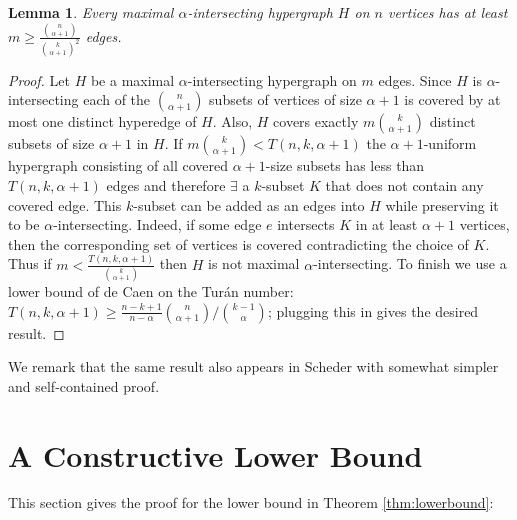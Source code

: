\documentclass[11pt,letterpaper]{article}
\newtheorem{theorem}{Theorem}
\newtheorem{lemma}[theorem]{Lemma}
\begin{document}
\begin{lemma}\label{lem:maximal-hypergraphs}
Every maximal $\alpha$-intersecting hypergraph $H$ on $n$ vertices has at least $m \geq \frac{\binom{n}{\alpha+1}}{\binom{k}{\alpha+1}^2}$ edges. 
\end{lemma}
\begin{proof}
Let $H$ be a maximal $\alpha$-intersecting hypergraph on $m$ edges. Since $H$ is $\alpha$-intersecting each of the $\binom{n}{\alpha+1}$ subsets of vertices of size $\alpha+1$ is covered by at most one distinct hyperedge of $H$. Also, $H$ covers exactly $m \binom{k}{\alpha+1}$ distinct subsets of size $\alpha+1$ in $H$. If $m{\binom{k}{\alpha+1}} < {T(n,k,\alpha+1)}$ the $\alpha+1$-uniform hypergraph consisting of all covered $\alpha+1$-size subsets has less than $T(n,k,\alpha+1)$ edges and therefore $\exists$ a $k$-subset $K$ that does not contain any covered edge. This $k$-subset can be added as an edges into $H$ while preserving it to be $\alpha$-intersecting. Indeed, if some edge $e$ intersects $K$ in at least $\alpha+1$ vertices, then the corresponding set of vertices is covered contradicting the choice of $K$. Thus if $m<\frac{T(n,k,\alpha+1)}{\binom{k}{\alpha+1}}$ then $H$ is not maximal $\alpha$-intersecting. To finish we use a lower bound of de Caen \cite{de1983extension} on the Tur{\'a}n number: $T(n,k,\alpha+1) \geq \frac{n-k+1}{n-\alpha}\binom{n}{\alpha+1}/\binom{k-1}{\alpha}$; plugging this in gives the desired result.
\end{proof}

We remark that the same result also appears in Scheder 
\cite{scheder08almostdisjoint} with somewhat simpler and
self-contained proof.


\section{A Constructive Lower Bound}

This section gives the proof for the lower bound in Theorem \ref{thm:lowerbound}:\\
\iffalse
\begin{theorem}\label{thm:lowerbound}
Every $\alpha$-intersecting $k$-CNF with less than 
\[\i = \frac{1}{2\alpha} \left(\frac{2^{(k-\alpha)}}{ek}-1\right)^{(2+1/\alpha)} \] clause intersections or
$$n =  \left(\frac{2^{(k-\alpha)}}{ek}\right)^{1/\alpha} $$ variables or 
$$m = \frac{1}{k} \left(\frac{2^{(k-\alpha)}}{ek}\right)^{1+1/\alpha} $$ clauses is satisfiable and a satisfying assignment can be found efficiently.
\end{theorem}
\fi
\end{document}
